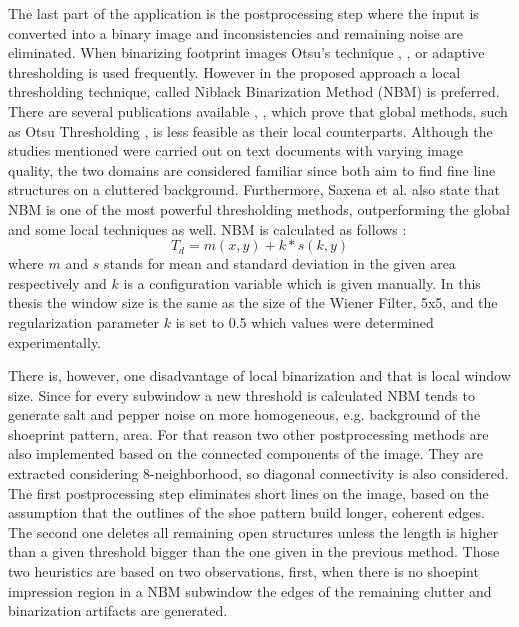 \documentclass[draft,final]{vutinfth} %
\begin{document}
\par
The last part of the application is the postprocessing step where the input is converted into a binary image and inconsistencies and remaining noise are eliminated.
When binarizing footprint images Otsu's technique \cite{algarni2008novel}, \cite{alizadeh2017automatic}, \cite{wu2019crime} or adaptive thresholding \cite{wang2014automatic} is used frequently.
However in the proposed approach a local thresholding technique, called Niblack Binarization Method (NBM) \cite{niblack1985introduction} is preferred.
There are several publications available \cite{som2011application}, \cite{athimethphat2011review}, which prove that global methods, such as Otsu Thresholding \cite{otsu1979threshold}, is less feasible as their local counterparts.
Although the studies mentioned were carried out on text documents with varying image quality, the two domains are considered familiar since both aim to find fine line structures on a cluttered background.
Furthermore, Saxena et al. \cite{saxena2019niblack} also state that NBM is one of the most powerful thresholding methods, outperforming the global and some local techniques as well. 
NBM  is calculated as follows \cite{saxena2019niblack}:
\[T_d = m(x,y) + k * s(k, y)\]
where $m$ and $s$ stands for mean and standard deviation in the given area respectively and $k$ is a configuration variable which is given manually. 
In this thesis the window size is the same as the size of the Wiener Filter, 5x5, and the regularization parameter $k$ is set to 0.5 which values were determined experimentally.
\par
There is, however, one disadvantage of local binarization and that is local window size.
Since for every subwindow a new threshold is calculated NBM tends to generate salt and pepper noise on more homogeneous, e.g. background of the shoeprint pattern, area.
For that reason two other postprocessing methods are also implemented based on the connected components of the image.
They are extracted considering 8-neighborhood, so diagonal connectivity is also considered.
The first postprocessing step eliminates short lines on the image, based on the assumption that the outlines of the shoe pattern build longer, coherent edges.
The second one deletes all remaining open structures unless the length is higher than a given threshold bigger than the one given in the previous method.
Those two heuristics are based on two observations, first,  when there is no shoepint impression region in a NBM subwindow the edges of the remaining clutter and binarization artifacts are generated.
\end{document}
